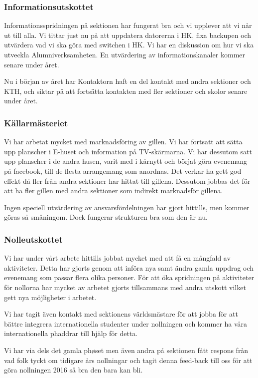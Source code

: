 \documentclass[../_main/handlingar.tex]{subfiles}
\begin{document}

\subsubsection*{Informationsutskottet}
Informationsspridningen på sektionen har fungerat bra och vi upplever att vi når ut till alla. Vi tittar just nu på att uppdatera datorerna i HK, fixa backupen och utvärdera vad vi ska göra med switchen i HK. Vi har en diskussion om hur vi ska utveckla Alumniverksamheten. En utvärdering av informationskanaler kommer senare under året.

Nu i början av året har Kontaktorn haft en del kontakt med andra sektioner och KTH, och siktar på att fortsätta kontakten med fler sektioner och skolor senare under året.

\subsubsection*{Källarmästeriet}
Vi har arbetat mycket med marknadsföring av gillen. Vi har fortsatt att sätta upp planscher i E-huset och information på TV-skärmarna. Vi har dessutom satt upp planscher i de andra husen, varit med i kårnytt och börjat göra evenemang på facebook, till de flesta arrangemang som anordnas. Det verkar ha gett god effekt då fler från andra sektioner har hittat till gillena. Dessutom jobbas det för att ha fler gillen med andra sektioner som indirekt marknadsför gillena.

Ingen speciell utvärdering av ansvarsfördelningen har gjort hittills, men kommer göras så småningom. Dock fungerar strukturen bra som den är nu.

\subsubsection*{Nolleutskottet}
Vi har under vårt arbete hittills jobbat mycket med att få en mångfald av aktiviteter. Detta har gjorts genom att införa nya samt ändra gamla uppdrag och evenemang som passar flera olika personer. För att öka spridningen på aktiviteter för nollorna har mycket av arbetet gjorts tillsammans med andra utskott vilket gett nya möjligheter i arbetet.

Vi har tagit även kontakt med sektionens världsmästare för att jobba för att bättre integrera internationella studenter under nollningen och kommer ha våra internationella phaddrar till hjälp för detta.

Vi har via dels det gamla phøset men även andra på sektionen fått respons från vad folk tyckt om tidigare års nollningar och tagit denna feed-back till oss för att göra nollningen 2016 så bra den bara kan bli.
\end{document}
